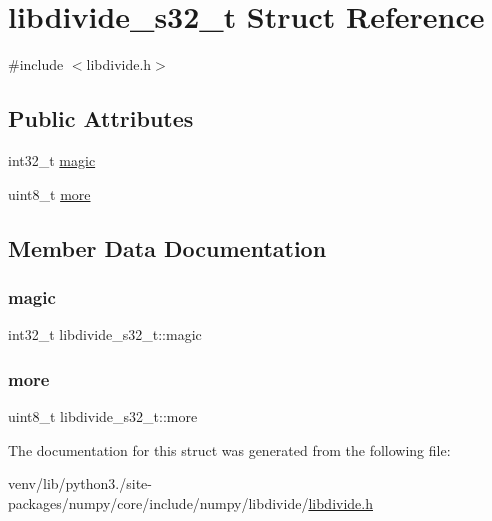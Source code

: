 \hypertarget{structlibdivide__s32__t}{}\section{libdivide\+\_\+s32\+\_\+t Struct Reference}
\label{structlibdivide__s32__t}


{\ttfamily \#include $<$libdivide.\+h$>$}

\subsection*{Public Attributes}
\begin{DoxyCompactItemize}
\item 
int32\+\_\+t \hyperlink{structlibdivide__s32__t_a26f5015ce3a38a3f962e848d851bbff3}{magic}
\item 
uint8\+\_\+t \hyperlink{structlibdivide__s32__t_aac2b77012fb8e16a7ce18a9e1362d819}{more}
\end{DoxyCompactItemize}


\subsection{Member Data Documentation}
\mbox{\label{structlibdivide__s32__t_a26f5015ce3a38a3f962e848d851bbff3}} 
\subsubsection{\texorpdfstring{magic}{magic}}
{\footnotesize\ttfamily int32\+\_\+t libdivide\+\_\+s32\+\_\+t\+::magic}

\mbox{\label{structlibdivide__s32__t_aac2b77012fb8e16a7ce18a9e1362d819}} 
\subsubsection{\texorpdfstring{more}{more}}
{\footnotesize\ttfamily uint8\+\_\+t libdivide\+\_\+s32\+\_\+t\+::more}



The documentation for this struct was generated from the following file\+:\begin{DoxyCompactItemize}
\item 
venv/lib/python3./site-\/packages/numpy/core/include/numpy/libdivide/\hyperlink{libdivide_8h}{libdivide.\+h}\end{DoxyCompactItemize}
